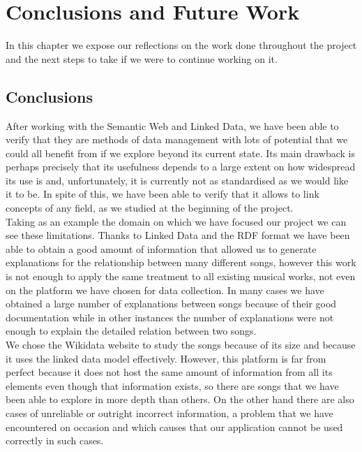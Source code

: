 \chapter{Conclusions and Future Work}
\label{cap:conclusions}

In this chapter we expose our reflections on the work done throughout the project and the next steps to take if we were to continue working on it.\\


\section{Conclusions}

After working with the Semantic Web and Linked Data, we have been able to verify that they are methods of data management with lots of potential that we could all benefit from if we explore beyond its current state. Its main drawback is perhaps precisely that its usefulness depends to a large extent on how widespread its use is and, unfortunately, it is currently not as standardised as we would like it to be. In spite of this, we have been able to verify that it allows to link concepts of any field, as we studied at the beginning of the project.\\

Taking as an example the domain on which we have focused our project we can see these limitations. Thanks to Linked Data and the RDF format we have been able to obtain a good amount of information that allowed us to generate explanations for the relationship between many different songs, however this work is not enough to apply the same treatment to all existing musical works, not even on the platform we have chosen for data collection. In many cases we have obtained a large number of explanations between songs because of their good documentation while in other instances the number of explanations were not enough to explain the detailed relation between two songs.\\

We chose the Wikidata website to study the songs because of its size and because it uses the linked data model effectively. However, this platform is far from perfect because it does not host the same amount of information from all its elements even though that information exists, so there are songs that we have been able to explore in more depth than others. On the other hand there are also cases of unreliable or outright incorrect information, a problem that we have encountered on occasion and which causes that our application cannot be used correctly in such cases.\\

